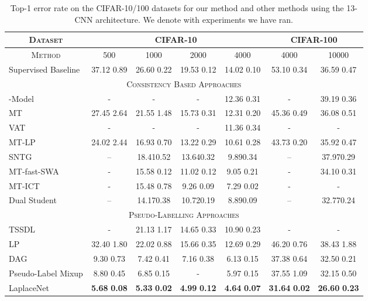 \documentclass[journal]{IEEEtran}
\begin{document}
\begin{table*}[t!]
  \centering
  \caption{Top-1 error rate on the CIFAR-10/100 datasets for our method and other methods using the 13-CNN architecture. We denote with  experiments we have ran.}
  \begin{tabular}{|l|cccc|cc|}
  \hline
   \multicolumn{1}{|c}{\cellcolor{gray!25} \textsc{Dataset}} & \multicolumn{4}{|c|}{\cellcolor{gray!25} \textsc{CIFAR-10}} & \multicolumn{2}{c|}{\cellcolor{gray!25} \textsc{CIFAR-100}}  \\ \hline
   \multicolumn{1}{|c|}{\cellcolor{gray!25} \textsc{Method}} & \cellcolor{gray!25} 500 & \cellcolor{gray!25} 1000 & \cellcolor{gray!25} 2000 & \cellcolor{gray!25} 4000 & \cellcolor{gray!25} 4000 & \multicolumn{1}{c|}{\cellcolor{gray!25} 10000} \\ \hline
   Supervised Baseline & 37.12  0.89 & 26.60  0.22 & 19.53  0.12 & 14.02  0.10 & 53.10  0.34  & 36.59  0.47  \\ \hline
    \multicolumn{7}{|c|}{\cellcolor{gray!25} \textsc{Consistency Based Approaches}}  \\ \hline
    -Model & -  & - & -  & 12.36  0.31 & - & 39.19  0.36  \\ 
    MT & 27.45  2.64 & 21.55  1.48 & 15.73  0.31 & 12.31  0.20 & 45.36  0.49 & 36.08  0.51 \\ 
    VAT & - & - &  - & 11.36  0.34  & -  & -  \\ 
    MT-LP & 24.02  2.44 & 16.93  0.70 & 13.22  0.29 & 10.61  0.28 & 43.73  0.20 & 35.92  0.47 \\ 
    SNTG & -- & 18.410.52  & 13.640.32  & 9.890.34  &  -- &   37.970.29 \\
    MT-fast-SWA & - & 15.58  0.12 & 11.02  0.12 & 9.05  0.21 & -  & 34.10  0.31  \\ 
    MT-ICT & - & 15.48  0.78 & 9.26  0.09 & 7.29  0.02 & - & -  \\ 
    Dual Student & -- & 14.170.38 & 10.720.19 & 8.890.09 &  -- &  32.770.24\\\hline
    \multicolumn{7}{|c|}{\cellcolor{gray!25} \textsc{Pseudo-Labelling Approaches}}  \\ \hline
    TSSDL & - & 21.13  1.17 & 14.65  0.33 & 10.90  0.23 & - & -  \\
    LP & 32.40  1.80 & 22.02  0.88 & 15.66  0.35 & 12.69  0.29 & 46.20  0.76 & 38.43  1.88  \\ 
    DAG & 9.30  0.73 & 7.42  0.41 & 7.16  0.38 & 6.13  0.15 &  37.38  0.64 & 32.50  0.21 \\
    Pseudo-Label Mixup & 8.80  0.45 & 6.85  0.15 &  - & 5.97  0.15 &  37.55  1.09 & 32.15  0.50  \\ 
    LaplaceNet  & \textbf{5.68}  \textbf{0.08} & \textbf{5.33}  \textbf{0.02} & \textbf{4.99}  \textbf{0.12} & \textbf{4.64}  \textbf{0.07} & \textbf{31.64}  \textbf{0.02} & \textbf{26.60}  \textbf{0.23}  \\ \hline
  \end{tabular}
  \label{table:cifar-cifar-cnn-compare}
\end{table*}
\end{document}
